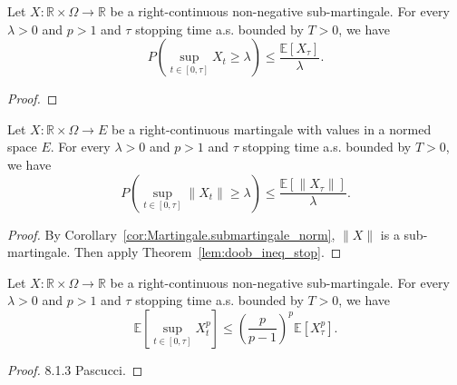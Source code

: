 \begin{lemma}\label{lem:doob_ineq_stop}
  Let $X:\mathbb{R}\times\Omega\rightarrow \mathbb{R}$ be a right-continuous non-negative sub-martingale.
  For every $\lambda>0$ and $p>1$ and $\tau$ stopping time a.s. bounded by $T>0$, we have
  $$
  P\left( \sup_{t\in[0,\tau]}X_t\geq\lambda \right)\leq \frac{\mathbb{E}[X_\tau]}{\lambda}.
  $$
\end{lemma}
\begin{proof}

\end{proof}

\begin{corollary}\label{cor:doob_ineq_stop}
  Let $X:\mathbb{R}\times\Omega\rightarrow E$ be a right-continuous martingale with values in a normed space $E$.
  For every $\lambda>0$ and $p>1$ and $\tau$ stopping time a.s. bounded by $T>0$, we have
  $$
  P\left( \sup_{t\in[0,\tau]}\lVert X_t \rVert \geq\lambda \right)\leq \frac{\mathbb{E}[\lVert X_\tau \rVert]}{\lambda}.
  $$
\end{corollary}
\begin{proof}
  By Corollary~\ref{cor:Martingale.submartingale_norm}, $\lVert X \rVert$ is a sub-martingale.
  Then apply Theorem~\ref{lem:doob_ineq_stop}.
\end{proof}

\begin{lemma}\label{lem:doob_ineq_stop_exp_val}
  Let $X:\mathbb{R}\times\Omega\rightarrow \mathbb{R}$ be a right-continuous non-negative sub-martingale.
  For every $\lambda>0$ and $p>1$ and $\tau$ stopping time a.s. bounded by $T>0$, we have
  $$
  \mathbb{E}\left[ \sup_{t\in[0,\tau]}X_t^p \right]\leq \left(\frac{p}{p-1}\right)^p\mathbb{E}[X_\tau^p].
  $$
\end{lemma}
\begin{proof}
  8.1.3 Pascucci.
\end{proof}

